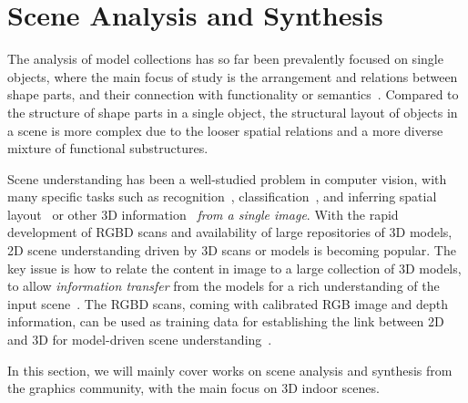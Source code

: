 \section{Scene Analysis and Synthesis}
\label{sec:scene}

The analysis of model collections has so far been prevalently focused on single objects,
where the main focus of study is the arrangement and relations between shape parts, and their
connection with functionality or semantics~\cite{Mitra:2014:SASP}.
Compared to the structure of shape parts in a single object, the structural layout of objects in a scene
is more complex due to the looser spatial relations and a more diverse mixture of functional substructures.

Scene understanding has been a well-studied problem in computer vision, with many specific tasks such as
recognition~\cite{quattoni2009}, classification~\cite{swadzba2010}, and
inferring spatial layout~\cite{Choi:2013:UIS} or other 3D information~\cite{Fouhey:2013:DDP} \emph{from a single image}.
With the rapid development of RGBD scans and availability of large repositories of 3D models,
2D scene understanding driven by 3D scans or models is becoming popular.
The key issue is how to relate the content in image to a large collection of 3D models,
to allow \emph{information transfer} from the models for a rich understanding of the input scene~\cite{Satkin:2012:DDS}.
The RGBD scans, coming with calibrated RGB image and depth information, can be used as training data for
establishing the link between 2D and 3D for model-driven scene understanding~\cite{Silberman:2012:ISS}.

In this section, we will mainly cover works on scene analysis and synthesis
from the graphics community, with the main focus on 3D indoor scenes.

